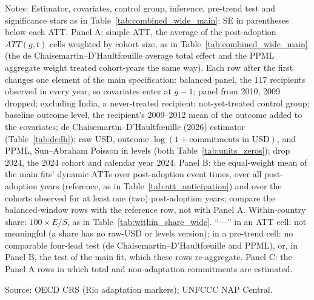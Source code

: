\begin{table}[H]
\begin{minipage}{\linewidth}\footnotesize
Notes: Estimator, covariates, control group, inference, pre-trend test and significance stars as in Table~\ref{tab:combined_wide_main}; SE in parentheses below each ATT. Panel A: simple ATT, the average of the post-adoption $ATT(g,t)$ cells weighted by cohort size, as in Table~\ref{tab:combined_wide_main} (the de Chaisemartin--D'Haultf{\oe}uille average total effect and the PPML aggregate weight treated cohort-years the same way). Each row after the first changes one element of the main specification: balanced panel, the 117 recipients observed in every year, so covariates enter at $g-1$; panel from 2010, 2009 dropped; excluding India, a never-treated recipient; not-yet-treated control group; baseline outcome level, the recipient's 2009--2012 mean of the outcome added to the covariates; de Chaisemartin--D'Haultf{\oe}uille (2026) estimator (Table~\ref{tab:dcdh}); raw USD, outcome $\log(1+\text{commitments in USD})$, and PPML, Sun--Abraham Poisson in levels (both Table~\ref{tab:units_zeros}); drop 2024, the 2024 cohort and calendar year 2024. Panel B: the equal-weight mean of the main fits' dynamic ATTs over post-adoption event times, over all post-adoption years (reference, as in Table~\ref{tab:att_anticipation}) and over the cohorts observed for at least one (two) post-adoption years; compare the balanced-window rows with the reference row, not with Panel A. Within-country share: $100 \times E/S$, as in Table~\ref{tab:within_share_wide}. ``---'' in an ATT cell: not meaningful (a share has no raw-USD or levels version); in a pre-trend cell: no comparable four-lead test (de Chaisemartin--D'Haultf{\oe}uille and PPML), or, in Panel B, the test of the main fit, which these rows re-aggregate. Panel C: the Panel A rows in which total and non-adaptation commitments are estimated.\par
Source: OECD CRS (Rio adaptation markers); UNFCCC NAP Central.
\end{minipage}
\end{table}
